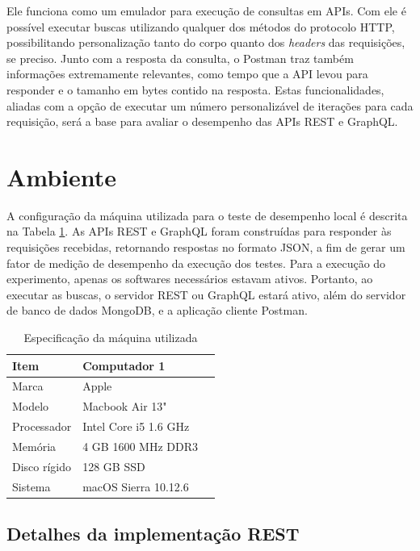 Ele funciona como um emulador para execução de consultas em APIs. Com ele é possível executar buscas utilizando qualquer dos métodos do protocolo HTTP, possibilitando personalização tanto do corpo quanto dos \textit{headers} das requisições, se preciso. Junto com a resposta da consulta, o Postman traz também informações extremamente relevantes, como tempo que a API levou para responder e o tamanho em bytes contido na resposta. Estas funcionalidades, aliadas com a opção de executar um número personalizável de iterações para cada requisição, será a base para avaliar o desempenho das APIs REST e GraphQL.

\section{Ambiente}

A configuração da máquina utilizada para o teste de desempenho local é descrita na Tabela \ref{tab:computers}. As APIs REST e GraphQL foram construídas para responder às requisições recebidas, retornando respostas no formato JSON, a fim de gerar um fator de medição de desempenho da execução dos testes. Para a execução do experimento, apenas os softwares necessários estavam ativos. Portanto, ao executar as buscas, o servidor REST ou GraphQL estará ativo, além do servidor de banco de dados MongoDB, e a aplicação cliente Postman.

\begin{table}[htbp]
    \centering
    \begin{tabular}{| l | l | l |}
        \hline
        \textbf{Item} & \textbf{Computador 1} \\ \hline
        Marca         & Apple                 \\ \hline
        Modelo        & Macbook Air 13"       \\ \hline
        Processador   & Intel Core i5 1.6 GHz \\ \hline
        Memória       & 4 GB 1600 MHz DDR3    \\ \hline
        Disco rígido  & 128 GB SSD            \\ \hline
        Sistema       & macOS Sierra 10.12.6  \\ \hline
    \end{tabular}
    \caption{Especificação da máquina utilizada} \label{tab:computers}
\end{table}

\subsection{Detalhes da implementação REST}

